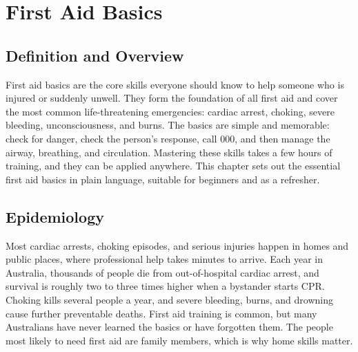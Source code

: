 \chapter{First Aid Basics}

\section*{Definition and Overview}
First aid basics are the core skills everyone should know to help someone who is injured or suddenly unwell. They form the foundation of all first aid and cover the most common life-threatening emergencies: cardiac arrest, choking, severe bleeding, unconsciousness, and burns. The basics are simple and memorable: check for danger, check the person's response, call 000, and then manage the airway, breathing, and circulation. Mastering these skills takes a few hours of training, and they can be applied anywhere. This chapter sets out the essential first aid basics in plain language, suitable for beginners and as a refresher.

\section*{Epidemiology}
Most cardiac arrests, choking episodes, and serious injuries happen in homes and public places, where professional help takes minutes to arrive. Each year in Australia, thousands of people die from out-of-hospital cardiac arrest, and survival is roughly two to three times higher when a bystander starts CPR. Choking kills several people a year, and severe bleeding, burns, and drowning cause further preventable deaths. First aid training is common, but many Australians have never learned the basics or have forgotten them. The people most likely to need first aid are family members, which is why home skills matter.


